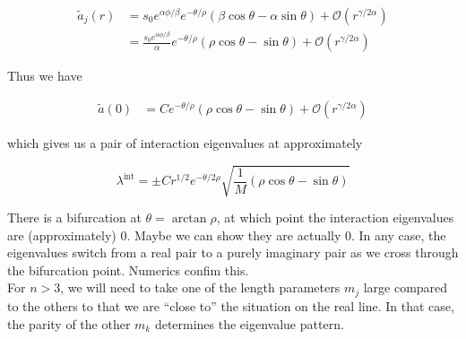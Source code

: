 \documentclass[12pt]{article}
\begin{document}
\begin{align*}
\tilde{a}_j(r)
&= s_0 e^{\alpha \phi/\beta} e^{-\theta/\rho} \left( \beta \cos \theta - \alpha \sin \theta \right) + \mathcal{O}(r^{\gamma/2\alpha})\\
&= \frac{s_0 e^{\alpha \phi/\beta} }{\alpha}  e^{-\theta/\rho} \left( \rho \cos \theta - \sin \theta \right) + \mathcal{O}(r^{\gamma/2\alpha})
\end{align*}

Thus we have

\begin{align*}
\tilde{a}(0) &= C e^{-\theta/\rho} \left( \rho \cos \theta - \sin \theta \right) + \mathcal{O}(r^{\gamma/2\alpha})
\end{align*}

which gives us a pair of interaction eigenvalues at approximately

\[
\lambda^{\text{int}} = \pm C r^{1/2} e^{-\theta/2\rho} \sqrt{ \frac{1}{M} \left( \rho \cos \theta - \sin \theta \right) }
\]

There is a bifurcation at $\theta = \arctan \rho$, at which point the interaction eigenvalues are (approximately) 0. Maybe we can show they are actually 0. In any case, the eigenvalues switch from a real pair to a purely imaginary pair as we cross through the bifurcation point. Numerics confim this.\\

For $n > 3$, we will need to take one of the length parameters $m_j$ large compared to the others to that we are ``close to'' the situation on the real line. In that case, the parity of the other $m_k$ determines the eigenvalue pattern.

\end{document}

